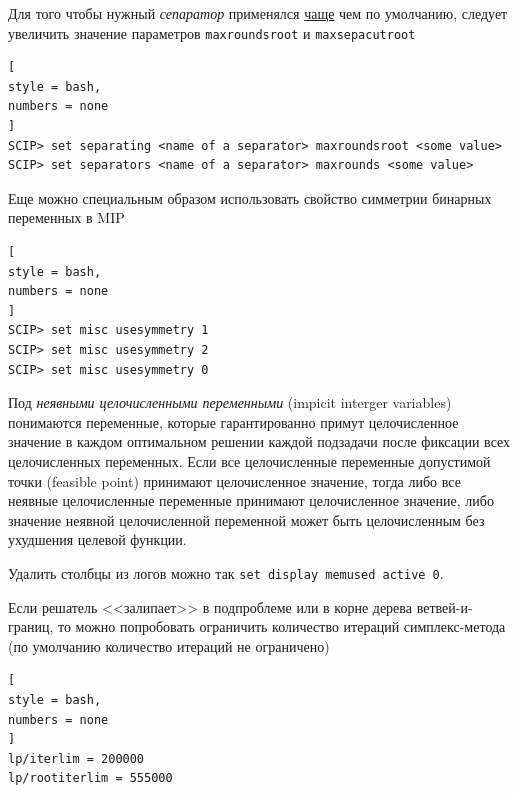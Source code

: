 \documentclass[%
	11pt,
	a4paper,
	utf8,
		]{article}
\begin{document}
Для того чтобы нужный \emph{сепаратор} применялся \underline{чаще} чем по умолчанию, следует увеличить значение параметров \verb|maxroundsroot| и \verb|maxsepacutroot|
\begin{lstlisting}[
style = bash,
numbers = none
]
SCIP> set separating <name of a separator> maxroundsroot <some value>
SCIP> set separators <name of a separator> maxrounds <some value>
\end{lstlisting}

Еще можно специальным образом использовать свойство симметрии бинарных переменных в MIP
\begin{lstlisting}[
style = bash,
numbers = none
]
SCIP> set misc usesymmetry 1
SCIP> set misc usesymmetry 2
SCIP> set misc usesymmetry 0
\end{lstlisting}

Под \emph{неявными целочисленными переменными} (impicit interger variables) понимаются переменные, которые гарантированно примут целочисленное значение в каждом оптимальном решении каждой подзадачи после фиксации всех целочисленных переменных. Если все целочисленные переменные допустимой точки (feasible point) принимают целочисленное значение, тогда либо все неявные целочисленные переменные принимают целочисленное значение, либо значение неявной целочисленной переменной может быть целочисленным без ухудшения целевой функции.

Удалить столбцы из логов можно так \verb|set display memused active 0|.


Если решатель <<залипает>> в подпроблеме или в корне дерева ветвей-и-границ, то можно попробовать ограничить количество итераций симплекс-метода (по умолчанию количество итераций не ограничено)
\begin{lstlisting}[
style = bash,
numbers = none
]
lp/iterlim = 200000
lp/rootiterlim = 555000
\end{lstlisting}



\listoffigures{}
\end{document}

